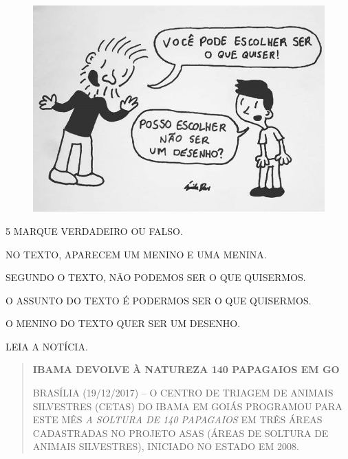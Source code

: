 \begin{figure}[htpb!]
\includegraphics[width=\textwidth]{media/image164.jpg}
\end{figure}


\pagebreak

\num{5} MARQUE VERDADEIRO OU FALSO.

\begin{boxlist}
 NO TEXTO, APARECEM UM MENINO E UMA MENINA.

 SEGUNDO O TEXTO, NÃO PODEMOS SER O QUE QUISERMOS.

 O ASSUNTO DO TEXTO É PODERMOS SER O QUE QUISERMOS.

 O MENINO DO TEXTO QUER SER UM DESENHO.
\end{boxlist}

LEIA A NOTÍCIA.

\begin{quote}
\textbf{IBAMA DEVOLVE À NATUREZA 140 PAPAGAIOS EM GO}

BRASÍLIA (19/12/2017) -- O CENTRO DE TRIAGEM DE ANIMAIS SILVESTRES
(CETAS) DO IBAMA EM GOIÁS PROGRAMOU PARA ESTE MÊS \emph{A SOLTURA DE 140
PAPAGAIOS} EM TRÊS ÁREAS CADASTRADAS NO PROJETO ASAS (ÁREAS DE SOLTURA
DE ANIMAIS SILVESTRES), INICIADO NO ESTADO EM 2008.~

\end{quote}


